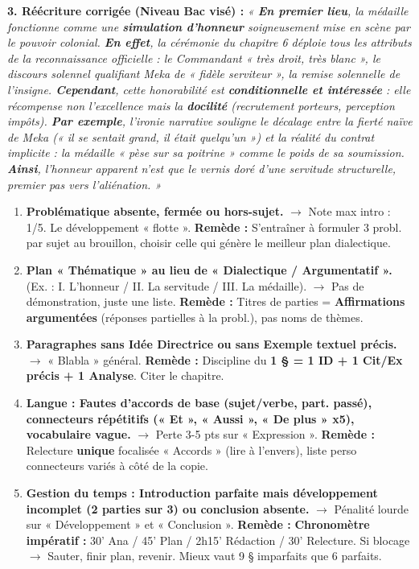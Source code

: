 \documentclass[11pt]{article}
\begin{document}
\begin{exoresolu}
\textbf{3. Réécriture corrigée (Niveau Bac visé) :}
\emph{« \textbf{En premier lieu}, la médaille fonctionne comme une \textbf{simulation d'honneur} soigneusement mise en scène par le pouvoir colonial. \textbf{En effet}, la cérémonie du chapitre 6 déploie tous les attributs de la reconnaissance officielle : le Commandant « très droit, très blanc », le discours solennel qualifiant Meka de « fidèle serviteur », la remise solennelle de l'insigne. \textbf{Cependant}, cette honorabilité est \textbf{conditionnelle et intéressée} : elle récompense non l'excellence mais la \textbf{docilité} (recrutement porteurs, perception impôts). \textbf{Par exemple}, l'ironie narrative souligne le décalage entre la fierté naïve de Meka (\emph{« il se sentait grand, il était quelqu'un »}) et la réalité du contrat implicite : la médaille « pèse sur sa poitrine » comme le poids de sa soumission. \textbf{Ainsi}, l'honneur apparent n'est que le vernis doré d'une servitude structurelle, premier pas vers l'aliénation. »}
\end{exoresolu}

\begin{attention}
\begin{enumerate}
    \item \textbf{Problématique absente, fermée ou hors-sujet.} $\to$ Note max intro : 1/5. Le développement « flotte ». \textbf{Remède :} S'entraîner à formuler 3 probl. par sujet au brouillon, choisir celle qui génère le meilleur plan dialectique.
    \item \textbf{Plan « Thématique » au lieu de « Dialectique / Argumentatif ».} (Ex. : I. L'honneur / II. La servitude / III. La médaille). $\to$ Pas de démonstration, juste une liste. \textbf{Remède :} Titres de parties = \textbf{Affirmations argumentées} (réponses partielles à la probl.), pas noms de thèmes.
    \item \textbf{Paragraphes sans Idée Directrice ou sans Exemple textuel précis.} $\to$ « Blabla » général. \textbf{Remède :} Discipline du \textbf{1 § = 1 ID + 1 Cit/Ex précis + 1 Analyse}. Citer le chapitre.
    \item \textbf{Langue : Fautes d'accords de base (sujet/verbe, part. passé), connecteurs répétitifs (« Et », « Aussi », « De plus » x5), vocabulaire vague.} $\to$ Perte 3-5 pts sur « Expression ». \textbf{Remède :} Relecture \textbf{unique} focalisée « Accords » (lire à l'envers), liste perso connecteurs variés à côté de la copie.
    \item \textbf{Gestion du temps : Introduction parfaite mais développement incomplet (2 parties sur 3) ou conclusion absente.} $\to$ Pénalité lourde sur « Développement » et « Conclusion ». \textbf{Remède :} \textbf{Chronomètre impératif :} 30' Ana / 45' Plan / 2h15' Rédaction / 30' Relecture. Si blocage $\to$ Sauter, finir plan, revenir. Mieux vaut 9 § imparfaits que 6 parfaits.
\end{enumerate}
\end{attention}
\end{document}
